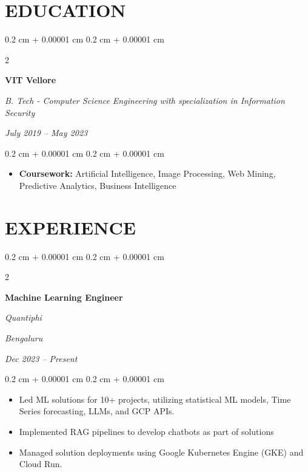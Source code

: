 \documentclass[10pt, letterpaper]{article}
\newenvironment{highlights}{
    \begin{itemize}[
        topsep=0.10 cm,
        parsep=0.10 cm,
        partopsep=0pt,
        itemsep=0pt,
        leftmargin=0.4 cm + 10pt
    ]
}{
    \end{itemize}
} %
\newenvironment{onecolentry}{
    \begin{adjustwidth}{
        0.2 cm + 0.00001 cm
    }{
        0.2 cm + 0.00001 cm
    }
}{
    \end{adjustwidth}
} %
\newenvironment{twocolentry}[2][]{
    \onecolentry
    \def\secondColumn{#2}
    \setcolumnwidth{\fill, 4.5 cm}
    \begin{paracol}{2}
}{
    \switchcolumn \raggedleft \secondColumn
    \end{paracol}
    \endonecolentry
} %
\begin{document}
    \vspace{0.2 cm}

    \section{EDUCATION}
        
        \begin{twocolentry}{
        
        \textit{July 2019 – May 2023}}
            \textbf{VIT Vellore}

            \textit{B. Tech - Computer Science Engineering with specialization in Information Security}
        \end{twocolentry}

        \vspace{0.10 cm}
        \begin{onecolentry}
            \begin{highlights}
                \item \textbf{Coursework:} Artificial Intelligence, Image Processing, Web Mining, Predictive Analytics, Business Intelligence
            \end{highlights}
        \end{onecolentry}
    \vspace{0.2 cm}


    
    \section{EXPERIENCE}
        \begin{twocolentry}{
        \textit{Bengaluru}    
            
        \textit{Dec 2023 – Present}}
            \textbf{Machine Learning Engineer}
            
            \textit{Quantiphi}
        \end{twocolentry}

        \vspace{0.10 cm}
        \begin{onecolentry}
            \begin{highlights}
                \item Led ML solutions for 10+ projects, utilizing statistical ML models, Time Series forecasting, LLMs, and GCP APIs.
                \item Implemented RAG pipelines to develop chatbots as part of solutions
                \item Managed solution deployments using Google Kubernetes Engine (GKE) and Cloud Run.
            \end{highlights}
        \end{onecolentry}
\end{document}

